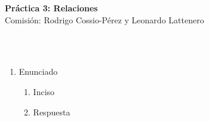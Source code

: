 \documentclass[a4paper]{article}
\newcommand{\answer}{\item[**]}
\newcommand{\exercise}{\item}
\begin{document}
\noindent \hrulefill 
\vspace{-7pt}
\begin{center} 
	\textbf{ Práctica 3: Relaciones} \\
	Comisión: Rodrigo Cossio-Pérez y Leonardo Lattenero
\end{center}
\vspace{-10pt}
\hrulefill \\
\phantom{~} \\

\begin{enumerate}

	\exercise Enunciado
	\begin{multicols}{3}
	\begin{enumerate} [label=(\alph*)]
		\item Inciso
		\answer Respuesta

	\end{enumerate}
	\end{multicols}


\end{enumerate}
\end{document}
